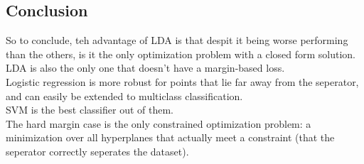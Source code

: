 \documentclass[12pt]{article}
\begin{document}
\newpage

\subsection*{Conclusion}

So to conclude, teh advantage of LDA is
that despit it being worse performing than the others,
is it the only optimization problem
with a closed form solution. \\

LDA is also the only one that doesn't have a margin-based
loss. \\

Logistic regression is more robust for points that lie
far away from the seperator, and can easily be
extended to multiclass classification. \\

SVM is the best classifier out of them. \\

The hard margin case is the only constrained
optimization problem: a minimization over
all hyperplanes that actually meet a constraint
(that the seperator correctly seperates the dataset). \\

\newpage
\end{document}
